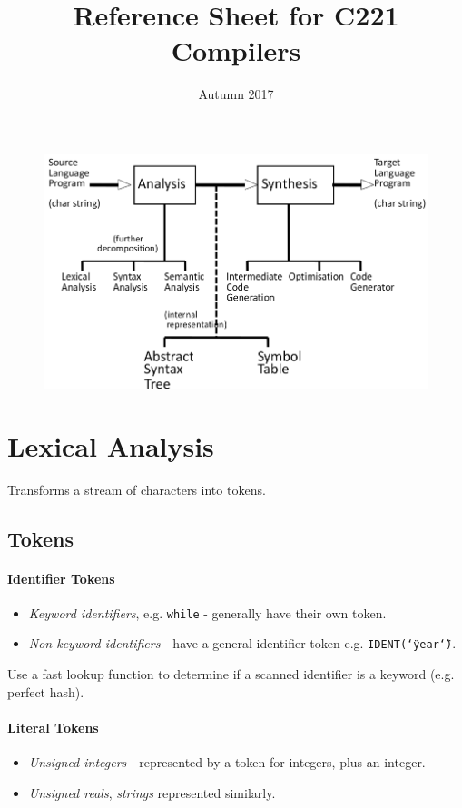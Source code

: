 \documentclass[twocolumn,english]{article}
\begin{document}
\title{Reference Sheet for C221 Compilers}

\date{Autumn 2017}

\maketitle
\begin{figure}[H]
\centering{}\includegraphics[width=0.7\linewidth]{img/compiler}
\end{figure}


\section{Lexical Analysis}

Transforms a stream of characters into tokens.

\subsection{Tokens}

\paragraph{Identifier Tokens}
\begin{itemize}
\item \emph{Keyword identifiers}, e.g. \texttt{while} - generally have their
own token.
\item \emph{Non-keyword identifiers} - have a general identifier token e.g.
\texttt{IDENT(\char`\"{}year\char`\"{})}.
\end{itemize}
Use a fast lookup function to determine if a scanned identifier is
a keyword (e.g. perfect hash).

\paragraph{Literal Tokens}
\begin{itemize}
\item \emph{Unsigned integers} - represented by a token for integers, plus
an integer.
\item \emph{Unsigned reals}, \emph{strings} represented similarly.
\end{itemize}
\end{document}
